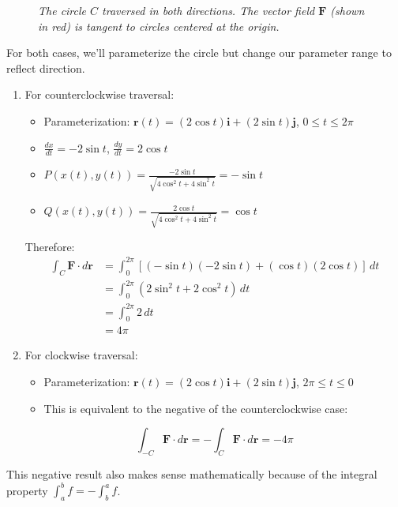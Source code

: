 \begin{example}
\begin{solution}
\begin{figure}[H]
        \caption{\textit{The circle $C$ traversed in both directions. The vector field $\mathbf{F}$ (shown in red) is tangent to circles centered at the origin.}}
        \label{fig:circle_directions}
        \end{figure}

\noindent For both cases, we'll parameterize the circle but change our parameter range to reflect direction.

\begin{enumerate}
\item For counterclockwise traversal:
\begin{itemize}
    \item Parameterization: $\mathbf{r}(t) = (2\cos t)\mathbf{i} + (2\sin t)\mathbf{j}$, $0 \leq t \leq 2\pi$
    \item $\frac{dx}{dt} = -2\sin t$, $\frac{dy}{dt} = 2\cos t$
    \item $P(x(t),y(t)) = \frac{-2\sin t}{\sqrt{4\cos^2 t + 4\sin^2 t}} = -\sin t$
    \item $Q(x(t),y(t)) = \frac{2\cos t}{\sqrt{4\cos^2 t + 4\sin^2 t}} = \cos t$
\end{itemize}

Therefore:
\begin{align*}
\int_C \mathbf{F}\cdot d\mathbf{r} &= \int_0^{2\pi} [(-\sin t)(-2\sin t) + (\cos t)(2\cos t)]\,dt \\
&= \int_0^{2\pi} (2\sin^2 t + 2\cos^2 t)\,dt \\
&= \int_0^{2\pi} 2\,dt \\
&= 4\pi
\end{align*}

\item For clockwise traversal:
\begin{itemize}
    \item Parameterization: $\mathbf{r}(t) = (2\cos t)\mathbf{i} + (2\sin t)\mathbf{j}$, $2\pi \leq t \leq 0$
    \item This is equivalent to the negative of the counterclockwise case:
\end{itemize}

\[
\int_{-C} \mathbf{F}\cdot d\mathbf{r} = -\int_C \mathbf{F}\cdot d\mathbf{r} = -4\pi
\]
\end{enumerate}
This negative result also makes sense mathematically because of the integral property $\int_a^b f = -\int_b^a f$.
\end{solution}
\end{example}


